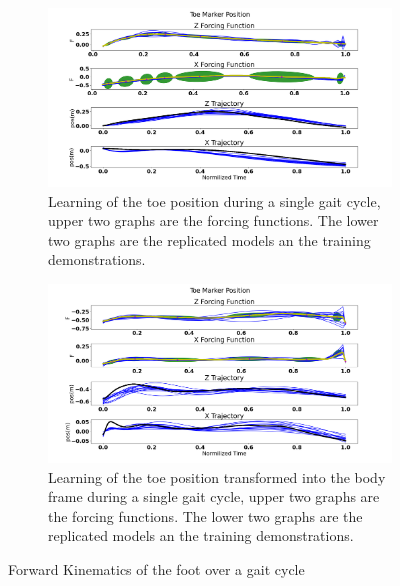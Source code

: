 \begin{figure}
    \centering
    \begin{subfigure}{\textwidth}
        \centering
        \includegraphics[scale=0.35]{images/gait_data/toe_maker_pos.png}
        \caption[Toe Marker Position]{Learning of the toe position during a single gait cycle, upper two graphs are the forcing functions. The lower two graphs are the replicated models an the training demonstrations.}
        \label{fig:learnedToe}
    \end{subfigure}
    \begin{subfigure}{\textwidth}
        \centering
        \includegraphics[scale=0.35]{images/gait_data/toe_position_body_frame.png}
        \caption[Toe Marker Position Transformed]{Learning of the toe position transformed into the body frame during a single gait cycle, upper two graphs are the forcing functions. The lower two graphs are the replicated models an the training demonstrations.}
        \label{fig:learnedToeTransformed}
    \end{subfigure}
    \caption{Forward Kinematics of the foot over a gait cycle}
    \label{fig:toeposition}
\end{figure}




